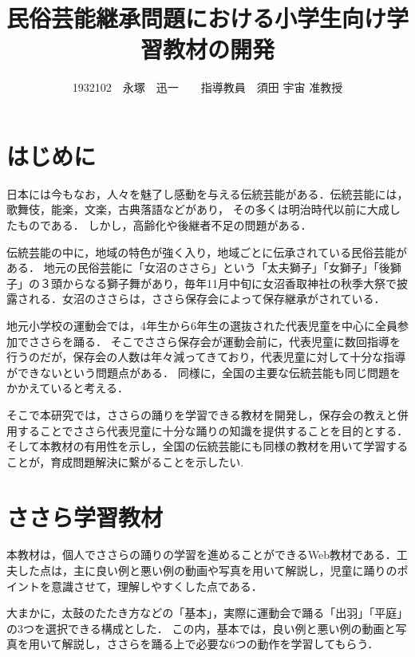 \documentclass[twocolumn,10pt,a4j]{ltjsarticle}
\title{民俗芸能継承問題における小学生向け学習教材の開発}
\author{1932102　永塚　迅一　　指導教員　須田 宇宙 准教授}
\date{}
\begin{document}
\maketitle
\section{はじめに}

日本には今もなお，人々を魅了し感動を与える伝統芸能がある．伝統芸能には，歌舞伎，能楽，文楽，古典落語などがあり，
その多くは明治時代以前に大成したものである．
しかし，高齢化や後継者不足の問題がある．

伝統芸能の中に，地域の特色が強く入り，地域ごとに伝承されている民俗芸能がある．
地元の民俗芸能に「女沼のささら」という「太夫獅子」「女獅子」「後獅子」の３頭からなる獅子舞があり，毎年11月中旬に女沼香取神社の秋季大祭で披露される\cite{suda2018}．女沼のささらは，ささら保存会によって保存継承がされている．


地元小学校の運動会では，4年生から6年生の選抜された代表児童を中心に全員参加でささらを踊る．
そこでささら保存会が運動会前に，代表児童に数回指導を行うのだが，保存会の人数は年々減ってきており，代表児童に対して十分な指導ができないという問題点がある．
同様に，全国の主要な伝統芸能も同じ問題をかかえていると考える．

そこで本研究では，ささらの踊りを学習できる教材を開発し，保存会の教えと併用することでささら代表児童に十分な踊りの知識を提供することを目的とする．
そして本教材の有用性を示し，全国の伝統芸能にも同様の教材を用いて学習することが，育成問題解決に繋がることを示したい.

\section{ささら学習教材}
本教材は，個人でささらの踊りの学習を進めることができるWeb教材である．工夫した点は，主に良い例と悪い例の動画や写真を用いて解説し，児童に踊りのポイントを意識させて，理解しやすくした点である．

大まかに，太鼓のたたき方などの「基本」，実際に運動会で踊る「出羽」「平庭」の3つを選択できる構成とした．
この内，基本では，良い例と悪い例の動画と写真を用いて解説し，ささらを踊る上で必要な6つの動作を学習してもらう．
\end{document}
